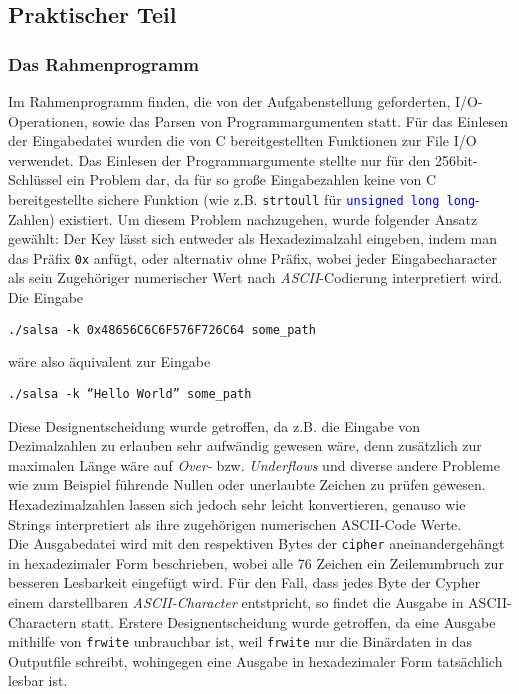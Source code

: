 \documentclass[course=erap]{aspdoc}
\begin{document}
\subsection{Praktischer Teil}
\subsubsection{Das Rahmenprogramm} \label{main}
Im Rahmenprogramm finden, die von der Aufgabenstellung geforderten, I/O-Opera\-tionen, sowie das Parsen von Programmargumenten statt.
Für das Einlesen der Eingabe\-datei wurden die von C bereitgestellten Funktionen zur File I/O verwendet. Das Einlesen der Programmargumente stellte nur für den 256bit-Schlüssel
ein Problem dar, da für so große Eingabezahlen keine von C bereitgestellte sichere Funktion (wie z.B. \texttt{strtoull} für \texttt{\textcolor{blue}{unsigned long long}}-Zahlen) existiert.
Um diesem Problem nachzugehen, wurde folgender Ansatz gewählt:
Der Key lässt sich entweder als Hexadezimalzahl eingeben, indem man das Präfix \texttt{0x} anfügt, oder alternativ ohne Präfix, wobei jeder Eingabecharacter als sein Zugehöriger numerischer Wert
nach \emph{ASCII}-Codierung inter\-pre\-tiert wird. Die Eingabe 
\begin{center}
  \texttt{./salsa -k 0x48656C6C6F576F726C64  some\_path}
\end{center} 
wäre also äquivalent zur Eingabe
\begin{center}
   \texttt{./salsa -k ``Hello World'' some\_path}
\end{center}
Diese Designentscheidung wurde getroffen, da z.B. die Eingabe von Dezimalzahlen zu erlauben sehr aufwändig gewesen wäre, denn zusätzlich zur maximalen Länge wäre auf \emph{Over-} bzw. \emph{Underflows} und diverse andere Probleme wie zum
Beispiel führende Nullen oder unerlaubte Zeichen zu prüfen gewesen. Hexadezimalzahlen lassen sich jedoch sehr leicht konvertieren, genauso wie Strings interpretiert als ihre zugehörigen numerischen ASCII-Code Werte.
\\Die Ausgabedatei wird mit den respektiven Bytes der \texttt{cipher} an\-einander\-ge\-hängt in hexadezimaler Form beschrieben, wobei alle 76 Zeichen ein Zeilenumbruch zur besseren Lesbarkeit eingefügt wird.
Für den Fall, dass jedes Byte der Cypher einem darstellbaren \emph{ASCII-Character} entstpricht, so findet die Ausgabe in ASCII-Charactern statt. Erstere Designentscheidung wurde getroffen, 
da eine Ausgabe mithilfe von \texttt{frwite} unbrauchbar ist, weil \texttt{frwite} nur die Binärdaten in das Outputfile schreibt, wohingegen eine Ausgabe in hexadezimaler Form tatsächlich lesbar ist.
\end{document}
